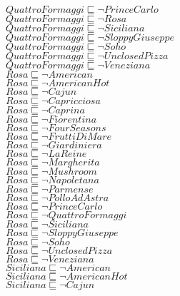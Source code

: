 \documentclass[a4paper,10pt]{article}
\begin{document}
 $QuattroFormaggi \sqsubseteq  \lnot PrinceCarlo$\\ 
 $QuattroFormaggi \sqsubseteq  \lnot Rosa$\\ 
 $QuattroFormaggi \sqsubseteq  \lnot Siciliana$\\ 
 $QuattroFormaggi \sqsubseteq  \lnot SloppyGiuseppe$\\ 
 $QuattroFormaggi \sqsubseteq  \lnot Soho$\\ 
 $QuattroFormaggi \sqsubseteq  \lnot UnclosedPizza$\\ 
 $QuattroFormaggi \sqsubseteq  \lnot Veneziana$\\ 
 $Rosa \sqsubseteq  \lnot American$\\ 
 $Rosa \sqsubseteq  \lnot AmericanHot$\\ 
 $Rosa \sqsubseteq  \lnot Cajun$\\ 
 $Rosa \sqsubseteq  \lnot Capricciosa$\\ 
 $Rosa \sqsubseteq  \lnot Caprina$\\ 
 $Rosa \sqsubseteq  \lnot Fiorentina$\\ 
 $Rosa \sqsubseteq  \lnot FourSeasons$\\ 
 $Rosa \sqsubseteq  \lnot FruttiDiMare$\\ 
 $Rosa \sqsubseteq  \lnot Giardiniera$\\ 
 $Rosa \sqsubseteq  \lnot LaReine$\\ 
 $Rosa \sqsubseteq  \lnot Margherita$\\ 
 $Rosa \sqsubseteq  \lnot Mushroom$\\ 
 $Rosa \sqsubseteq  \lnot Napoletana$\\ 
 $Rosa \sqsubseteq  \lnot Parmense$\\ 
 $Rosa \sqsubseteq  \lnot PolloAdAstra$\\ 
 $Rosa \sqsubseteq  \lnot PrinceCarlo$\\ 
 $Rosa \sqsubseteq  \lnot QuattroFormaggi$\\ 
 $Rosa \sqsubseteq  \lnot Siciliana$\\ 
 $Rosa \sqsubseteq  \lnot SloppyGiuseppe$\\ 
 $Rosa \sqsubseteq  \lnot Soho$\\ 
 $Rosa \sqsubseteq  \lnot UnclosedPizza$\\ 
 $Rosa \sqsubseteq  \lnot Veneziana$\\ 
 $Siciliana \sqsubseteq  \lnot American$\\ 
 $Siciliana \sqsubseteq  \lnot AmericanHot$\\ 
 $Siciliana \sqsubseteq  \lnot Cajun$\\ 
\end{document}
